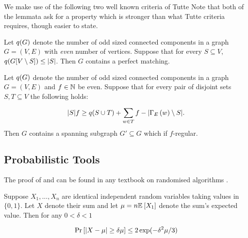 \documentclass[11pt]{article}
\begin{document}
We make use of the following two well known criteria of Tutte  Note that both of the lemmata ask for a property which is stronger than what Tutte criteria requires, though easier to state.

\begin{lemma}\label{lemma:tutte-criterion}
Let $q(G)$ denote the number of odd sized connected components in a graph $G=(V,E)$ with \emph{even} number of vertices. Suppose that for every $S \subseteq V$, $q(G[V \setminus S]) \leq |S|$. Then $G$ contains a perfect matching.
\end{lemma}

\begin{lemma}\label{lemma:tutte-criterion-factor}
  Let $q(G)$ denote the number of odd sized connected components in a graph $G=(V,E)$ and $f \in \mathbb{N}$ be even. Suppose that for every pair of disjoint sets $S, T \subseteq V$ the following holds:

  \[ |S|f \geq q(S \cup T) + \sum_{w \in T} f - |\Gamma_{E}\left(w\right) \setminus S|. \]
  Then $G$ contains a spanning subgraph $G' \subseteq G$ which if $f$-regular.
\end{lemma}



\subsection{Probabilistic Tools}

The proof of  and 
can be found in any textbook on randomised algorithms \citep[See Chapter 1, Chapter 7]{mitzenmacher2017probability}.

\begin{lemma}\label{lemma:mult-chernoff}
Suppose $X_1, ..., X_n$ are identical independent random variables taking values in $\{0, 1\}$. Let $X$ denote their sum and let $\mu = n\mathbb{E}_{}\left[X_1\right]$ denote the sum's expected value. Then for any $0 < \delta < 1$

\[ \Pr\left[|X - \mu| \geq \delta \mu \right] \leq 2\exp(-\delta^2\mu/3)\]

\end{lemma}
\end{document}
